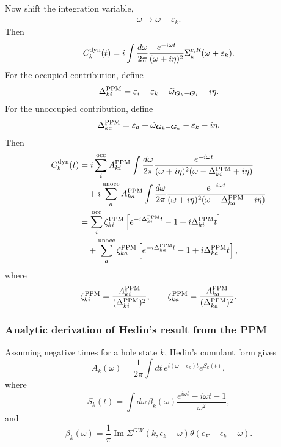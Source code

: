 Now shift the integration variable,
\begin{align}
\omega \rightarrow \omega+\varepsilon_k.
\end{align}
Then
\begin{align}
C_k^{\rm dyn}(t)
=
i\int\frac{d\omega}{2\pi}
\frac{e^{-i\omega t}}{(\omega+i\eta)^2}
\Sigma_k^{c,R}(\omega+\varepsilon_k).
\end{align}
For the occupied contribution, define
\begin{align}
\Delta_{ki}^{\rm PPM}
=
\varepsilon_i-\varepsilon_k-\widetilde{\omega}_{\bm G_k-\bm G_i}-i\eta.
\end{align}
For the unoccupied contribution, define
\begin{align}
\Delta_{ka}^{\rm PPM}
=
\varepsilon_a+\widetilde{\omega}_{\bm G_k-\bm G_a}-\varepsilon_k-i\eta.
\end{align}
Then
\begin{align}
C_k^{\rm dyn}(t)
&=
i\sum_i^{\rm occ}
A_{ki}^{\rm PPM}
\int\frac{d\omega}{2\pi}
\frac{e^{-i\omega t}}
     {(\omega+i\eta)^2(\omega-\Delta_{ki}^{\rm PPM}+i\eta)}
\\
&\quad+
i\sum_a^{\rm unocc}
A_{ka}^{\rm PPM}
\int\frac{d\omega}{2\pi}
\frac{e^{-i\omega t}}
     {(\omega+i\eta)^2(\omega-\Delta_{ka}^{\rm PPM}+i\eta)}\\
&=
\sum_i^{\rm occ}
\zeta_{ki}^{\rm PPM}
\left[
e^{-i\Delta_{ki}^{\rm PPM}t}
-1
+i\Delta_{ki}^{\rm PPM}t
\right]
\\
&\quad+
\sum_a^{\rm unocc}
\zeta_{ka}^{\rm PPM}
\left[
e^{-i\Delta_{ka}^{\rm PPM}t}
-1
+i\Delta_{ka}^{\rm PPM}t
\right],
\end{align}
where
\begin{align}
\zeta_{ki}^{\rm PPM}
=
\frac{A_{ki}^{\rm PPM}}
     {(\Delta_{ki}^{\rm PPM})^2},
\qquad
\zeta_{ka}^{\rm PPM}
=
\frac{A_{ka}^{\rm PPM}}
     {(\Delta_{ka}^{\rm PPM})^2}.
\end{align}

\subsubsection{Analytic derivation of Hedin's result from the PPM}

Assuming negative times for a hole state \(k\), Hedin's cumulant form gives
\begin{equation}
    A_k(\omega)
    =
    \frac{1}{2\pi}
    \int dt\,
    e^{i(\omega-\epsilon_k)t}
    e^{S_k(t)},
\end{equation}
where
\begin{equation}
    S_k(t)
    =
    \int d\omega\,
    \beta_k(\omega)
    \frac{e^{i\omega t}-i\omega t-1}{\omega^2},
\end{equation}
and
\begin{equation}
    \beta_k(\omega)
    =
    \frac{1}{\pi}
    \operatorname{Im}
    \Sigma^{GW}(k,\epsilon_k-\omega)
    \theta(\epsilon_F-\epsilon_k+\omega).
\end{equation}

